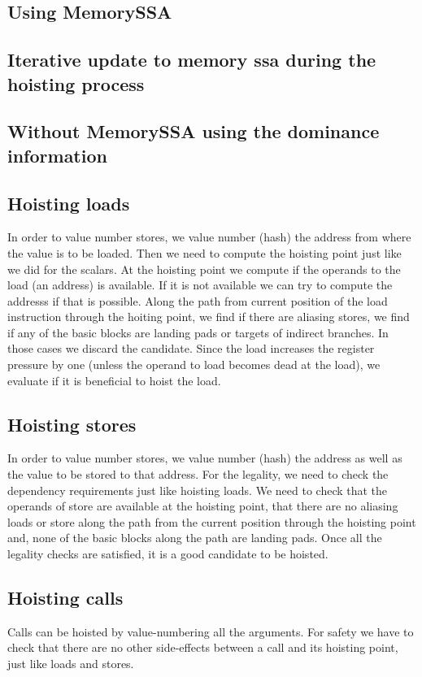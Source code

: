 \documentclass{sig-alternate}
\begin{document}
\subsection{Using MemorySSA}
\subsection{Iterative update to memory ssa during the hoisting process}

\subsection{Without MemorySSA using the dominance information}

\subsection{Hoisting loads}
In order to value number stores, we value number (hash) the address from where
the value is to be loaded. Then we need to compute the hoisting point just like
we did for the scalars. At the hoisting point we compute if the operands to the
load (an address) is available. If it is not available we can try to compute the
addresss if that is possible.  Along the path from current position of the load
instruction through the hoiting point, we find if there are aliasing stores, we
find if any of the basic blocks are landing pads or targets of indirect
branches. In those cases we discard the candidate. Since the load increases the
register pressure by one (unless the operand to load becomes dead at the load),
we evaluate if it is beneficial to hoist the load.

\subsection{Hoisting stores}
In order to value number stores, we value number (hash) the address as well as
the value to be stored to that address. For the legality, we need to check the
dependency requirements just like hoisting loads. We need to check that the
operands of store are available at the hoisting point, that there are no
aliasing loads or store along the path from the current position through the
hoisting point and, none of the basic blocks along the path are landing pads.
Once all the legality checks are satisfied, it is a good candidate to be
hoisted.

\subsection{Hoisting calls}
Calls can be hoisted by value-numbering all the arguments. For safety
we have to check that there are no other side-effects between a call and
its hoisting point, just like loads and stores.
\end{document}
